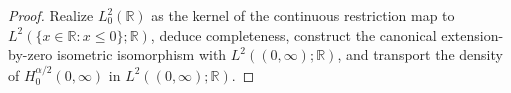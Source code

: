 \begin{proof}
\leanok
Realize $L^2_0(\mathbb{R})$ as the kernel of the continuous restriction map to $L^2(\{x \in \mathbb{R} : x \le 0\}; \mathbb{R})$, deduce completeness, construct the canonical extension-by-zero isometric isomorphism with $L^2((0, \infty); \mathbb{R})$, and transport the density of $H^{\alpha/2}_0(0, \infty)$ in $L^2((0, \infty); \mathbb{R})$.
\end{proof}
